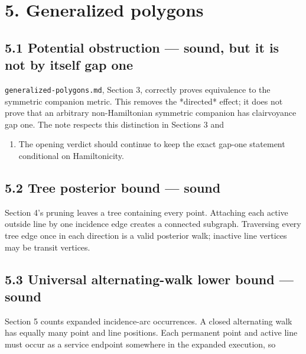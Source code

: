 \documentclass[11pt,a4paper]{article}
\begin{document}
\section*{5. Generalized polygons}

\subsection*{5.1 Potential obstruction — sound, but it is not by itself gap one}

\nolinkurl{generalized-polygons.md}, Section 3, correctly proves equivalence to the symmetric companion metric.  This removes the *directed* effect; it does not prove that an arbitrary non-Hamiltonian symmetric companion has clairvoyance gap one.  The note respects this distinction in Sections 3 and


\begin{enumerate}

\item The opening verdict should continue to keep the exact gap-one statement conditional on Hamiltonicity.

\end{enumerate}

\subsection*{5.2 Tree posterior bound — sound}

Section 4's pruning leaves a tree containing every point.  Attaching each active outside line by one incidence edge creates a connected subgraph. Traversing every tree edge once in each direction is a valid posterior walk; inactive line vertices may be transit vertices.


\subsection*{5.3 Universal alternating-walk lower bound — sound}

Section 5 counts expanded incidence-arc occurrences.  A closed alternating walk has equally many point and line positions.  Each permanent point and active line must occur as a service endpoint somewhere in the expanded execution, so
\end{document}

